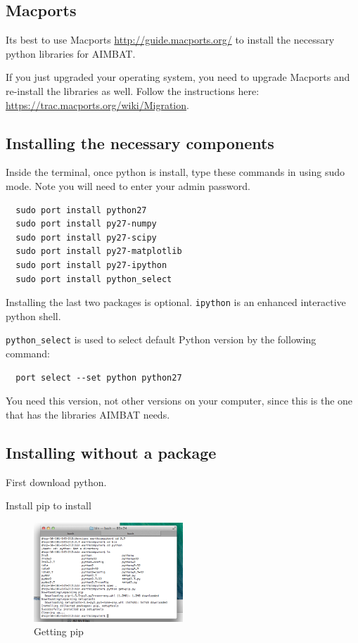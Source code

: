 \documentclass[letterpaper,10pt]{article}
\begin{document}

\subsection{Macports}

Its best to use Macports \url{http://guide.macports.org/} to install the necessary python libraries for AIMBAT. 

If you just upgraded your operating system, you need to upgrade Macports and re-install the libraries as well. Follow the instructions here: \url{https://trac.macports.org/wiki/Migration}.


\subsection{Installing the necessary components}

Inside the terminal, once python is install, type these commands in using sudo mode. Note you will need to enter your admin password.

\begin{verbatim}
  sudo port install python27
  sudo port install py27-numpy
  sudo port install py27-scipy
  sudo port install py27-matplotlib
  sudo port install py27-ipython
  sudo port install python_select
\end{verbatim}

Installing the last two packages is optional. \verb"ipython" is an enhanced interactive python shell.

\verb"python_select" is used to select default Python version by the following command:

\begin{verbatim}
  port select --set python python27
\end{verbatim}

You need this version, not other versions on your computer, since this is the one that has the libraries AIMBAT needs.

\subsection{Installing without a package}

First download python.

Install pip to install 

\begin{figure}[h!]
  \centering
  \includegraphics[width=0.5\textwidth]{images/getting_pip}
  \caption{Getting pip}
  \label{fig:getting_pip}
\end{figure}
\end{document}
